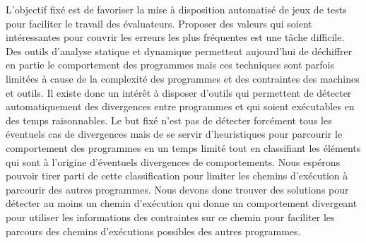 L'objectif fixé est de favoriser la mise à disposition automatisé de jeux de tests pour faciliter le travail des évaluateurs. Proposer des valeurs qui soient intéressantes pour couvrir les erreurs les plus fréquentes est une tâche difficile. 
Des outils d'analyse statique et dynamique permettent aujourd'hui de déchiffrer en partie le comportement des programmes mais ces techniques sont parfois limitées à cause de la complexité des programmes et des contraintes des machines et outils.
Il existe donc un intérêt à disposer d'outils qui permettent de détecter automatiquement des divergences entre programmes et qui soient exécutables en des temps raisonnables. 
Le but fixé n'est pas de détecter forcément tous les éventuels cas de divergences mais de se servir d'heuristiques pour parcourir le comportement des programmes en un temps limité tout en classifiant les éléments qui sont à l'origine d'éventuels divergences de comportements. Nous espérons pouvoir tirer parti de cette classification pour limiter les chemins d'exécution à parcourir des autres programmes. Nous devons donc trouver des solutions pour détecter au moins un chemin d'exécution qui donne un comportement divergeant pour utiliser les informations des contraintes sur ce chemin pour faciliter les parcours des chemins d'exécutions possibles des autres programmes.

